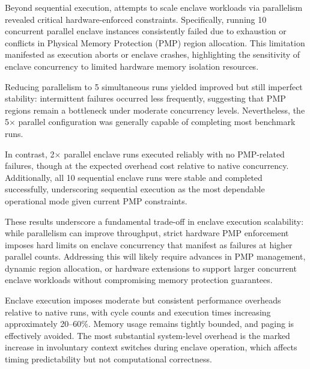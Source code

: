 Beyond sequential execution, attempts to scale enclave workloads via parallelism revealed critical hardware-enforced constraints. Specifically, running 10 concurrent parallel enclave instances consistently failed due to exhaustion or conflicts in Physical Memory Protection (PMP) region allocation. This limitation manifested as execution aborts or enclave crashes, highlighting the sensitivity of enclave concurrency to limited hardware memory isolation resources.

Reducing parallelism to 5 simultaneous runs yielded improved but still imperfect stability: intermittent failures occurred less frequently, suggesting that PMP regions remain a bottleneck under moderate concurrency levels. Nevertheless, the 5$\times$ parallel configuration was generally capable of completing most benchmark runs.

In contrast, 2$\times$ parallel enclave runs executed reliably with no PMP-related failures, though at the expected overhead cost relative to native concurrency. Additionally, all 10 sequential enclave runs were stable and completed successfully, underscoring sequential execution as the most dependable operational mode given current PMP constraints.


These results underscore a fundamental trade-off in enclave execution scalability: while parallelism can improve throughput, strict hardware PMP enforcement imposes hard limits on enclave concurrency that manifest as failures at higher parallel counts. Addressing this will likely require advances in PMP management, dynamic region allocation, or hardware extensions to support larger concurrent enclave workloads without compromising memory protection guarantees.

Enclave execution imposes moderate but consistent performance overheads relative to native runs, with cycle counts and execution times increasing approximately 20--60\%. Memory usage remains tightly bounded, and paging is effectively avoided. The most substantial system-level overhead is the marked increase in involuntary context switches during enclave operation, which affects timing predictability but not computational correctness.

